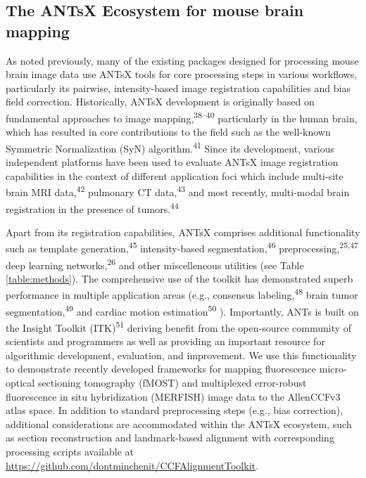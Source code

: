 \documentclass[
  12pt,
]{article}
\begin{document}
\hypertarget{the-antsx-ecosystem-for-mouse-brain-mapping}{%
\subsection{The ANTsX Ecosystem for mouse brain
mapping}\label{the-antsx-ecosystem-for-mouse-brain-mapping}}



As noted previously, many of the existing packages designed for
processing mouse brain image data use ANTsX tools for core processing
steps in various workflows, particularly its pairwise, intensity-based
image registration capabilities and bias field correction. Historically,
ANTsX development is originally based on fundamental approaches to image
mapping,\textsuperscript{38--40} particularly in the human brain, which
has resulted in core contributions to the field such as the well-known
Symmetric Normalization (SyN) algorithm.\textsuperscript{41} Since its
development, various independent platforms have been used to evaluate
ANTsX image registration capabilities in the context of different
application foci which include multi-site brain MRI
data,\textsuperscript{42} pulmonary CT data,\textsuperscript{43} and
most recently, multi-modal brain registration in the presence of
tumors.\textsuperscript{44}

Apart from its registration capabilities, ANTsX comprises additional
functionality such as template generation,\textsuperscript{45}
intensity-based segmentation,\textsuperscript{46}
preprocessing,\textsuperscript{25,47} deep learning
networks,\textsuperscript{26} and other miscelleneous utilities (see
Table \ref{table:methods}). The comprehensive use of the toolkit has
demonstrated superb performance in multiple application areas (e.g.,
consensus labeling,\textsuperscript{48} brain tumor
segmentation,\textsuperscript{49} and cardiac motion
estimation\textsuperscript{50} ). Importantly, ANTs is built on the
Insight Toolkit (ITK)\textsuperscript{51} deriving benefit from the
open-source community of scientists and programmers as well as providing
an important resource for algorithmic development, evaluation, and
improvement. We use this functionality to demonstrate recently developed
frameworks for mapping fluorescence micro-optical sectioning tomography
(fMOST) and multiplexed error-robust fluorescence in situ hybridization
(MERFISH) image data to the AllenCCFv3 atlas space. In addition to
standard preprocessing steps (e.g., bias correction), additional
considerations are accommodated within the ANTsX ecosystem, such as
section reconstruction and landmark-based alignment with corresponding
processing scripts available at
\url{https://github.com/dontminchenit/CCFAlignmentToolkit}.
\end{document}
